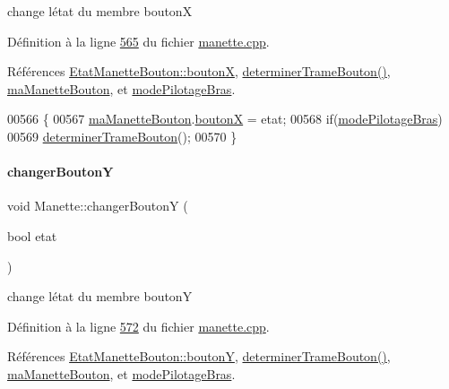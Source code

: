 change l\textquotesingle{}état du membre boutonX 



Définition à la ligne \hyperlink{manette_8cpp_source_l00565}{565} du fichier \hyperlink{manette_8cpp_source}{manette.\+cpp}.



Références \hyperlink{manette_8h_source_l00126}{Etat\+Manette\+Bouton\+::boutonX}, \hyperlink{manette_8cpp_source_l00393}{determiner\+Trame\+Bouton()}, \hyperlink{manette_8h_source_l00215}{ma\+Manette\+Bouton}, et \hyperlink{manette_8h_source_l00254}{mode\+Pilotage\+Bras}.


\begin{DoxyCode}
00566 \{
00567     \hyperlink{class_manette_ae69fd9baa0dad8a960fa93611b6a185f}{maManetteBouton}.\hyperlink{struct_etat_manette_bouton_a4a1d74300413624fd13841eb11c6e974}{boutonX} = etat;
00568     \textcolor{keywordflow}{if}(\hyperlink{class_manette_acc2cd9afa45328c0da5c580e5c1a67db}{modePilotageBras})
00569         \hyperlink{class_manette_a3fb9d1245400b6bb6379fbb63a8099ba}{determinerTrameBouton}();
00570 \}
\end{DoxyCode}
\mbox{\label{class_manette_a070a7551299aad2db041591004d2bc60}} 
\paragraph{\texorpdfstring{changer\+BoutonY}{changerBoutonY}}
{\footnotesize\ttfamily void Manette\+::changer\+BoutonY (\begin{DoxyParamCaption}\item[{bool}]{etat }\end{DoxyParamCaption})\hspace{0.3cm}{\ttfamily [slot]}}



change l\textquotesingle{}état du membre boutonY 



Définition à la ligne \hyperlink{manette_8cpp_source_l00572}{572} du fichier \hyperlink{manette_8cpp_source}{manette.\+cpp}.



Références \hyperlink{manette_8h_source_l00127}{Etat\+Manette\+Bouton\+::boutonY}, \hyperlink{manette_8cpp_source_l00393}{determiner\+Trame\+Bouton()}, \hyperlink{manette_8h_source_l00215}{ma\+Manette\+Bouton}, et \hyperlink{manette_8h_source_l00254}{mode\+Pilotage\+Bras}.


